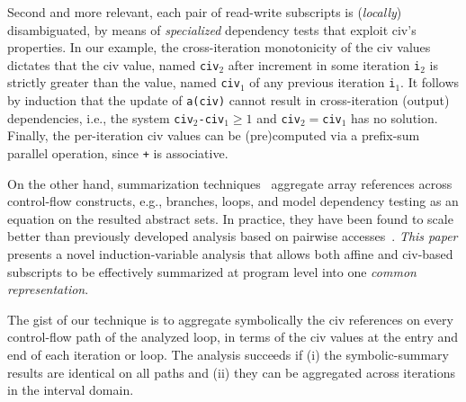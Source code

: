 \documentclass{sig-alternate}
\begin{document}
Second and more relevant, each pair of read-write subscripts is ({\em locally}) 
disambiguated, by means of {\em specialized} dependency tests that exploit
{\sc civ}'s properties. %
In our example, the cross-iteration monotonicity of the {\sc civ} values 
dictates that the {\sc civ} value, named {\tt civ$_2$} after increment 
in some iteration {\tt i$_2$} is strictly greater than the value,
named {\tt civ$_1$} of any previous iteration {\tt i$_1$}.
It follows by induction that the update of {\tt a(civ)}
cannot result in cross-iteration (output) dependencies, i.e.,
the system {\tt civ$_2$-civ$_1 \geq 1$} and {\tt civ$_2 = $civ$_1$}
has no solution. %
Finally, the per-iteration {\sc civ} values can be (pre)computed 
via a prefix-sum parallel operation, since {\tt +} is associative.

On the other hand, summarization techniques~\cite{SUIF,LMAD,CosPLDI} aggregate 
array references across control-flow constructs, e.g., branches, loops, and  
model dependency testing as an equation on the resulted abstract sets.
%
In practice, they have been found to scale better than previously developed
analysis based on pairwise accesses~\cite{SUIF}.
% 
%
{\em This paper} presents a novel induction-variable analysis
that allows both affine and {\sc civ}-based subscripts
%
to be effectively summarized at program level into one {\em common representation}.

The gist of our technique is to aggregate symbolically the {\sc civ} 
references on every control-flow path of the analyzed loop, in terms
of the {\sc civ} values at the entry and end of each iteration or loop.
The analysis succeeds if (i) the symbolic-summary results are identical 
on all paths and (ii) they can be aggregated across iterations %
in the interval domain. %
\end{document}
